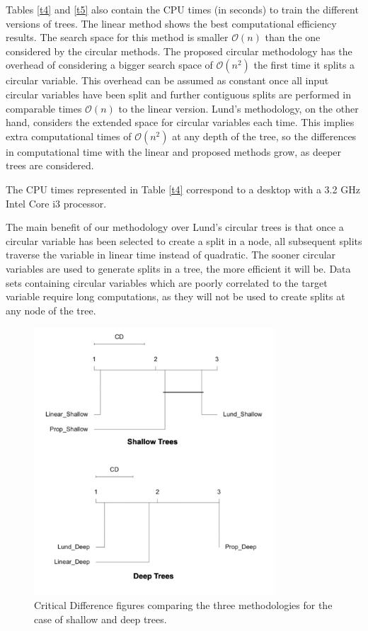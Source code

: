 \documentclass[times,twocolumn,final,authoryear]{elsarticle}
\begin{document}
Tables \ref{t4} and \ref{t5} also contain the CPU times (in seconds) to train the different versions of trees. The linear method shows the best computational efficiency results. The search space for this method is smaller $\mathcal{O}(n)$ than the one considered by the circular methods. The proposed circular methodology has the overhead of considering a bigger search space of $\mathcal{O}(n^2)$ the first time it splits a circular variable. This overhead can be assumed as constant once all input circular variables have been split and further contiguous splits are performed in comparable times $\mathcal{O}(n)$ to the linear version. Lund's methodology, on the other hand, considers the extended space for circular variables each time. This implies extra computational times of $\mathcal{O}(n^2)$ at any depth of the tree, so the differences in computational time with the linear and proposed methods grow, as deeper trees are considered.

The CPU times represented in Table \ref{t4} correspond to a desktop with a 3.2 GHz Intel Core i3 processor.

The main benefit of our methodology over Lund's circular trees is that once a circular variable has been selected to create a split in a node, all subsequent splits traverse the variable in linear time instead of quadratic. The sooner circular variables are used to generate splits in a tree, the more efficient it will be. Data sets containing circular variables which are poorly correlated to the target variable require long computations, as they will not be used to create splits at any node of the tree.


\begin{figure}
\centering
\parbox{9cm}{
\includegraphics[width=9cm]{CD.pdf}}
\qquad
\caption{Critical Difference figures comparing the three methodologies for the case of shallow and deep trees.}
\label{f7}
\end{figure}
\end{document}
